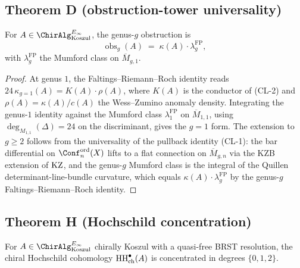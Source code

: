 \subsection{Theorem D (obstruction-tower universality)}
\label{subsec:climax-thmD}

\begin{corollary}
\label{cor:thmD-from-climax}
\ClaimStatusProvedHere
For \(A \in \ChirAlgInf_{\mathrm{Koszul}}\), the genus-\(g\)
obstruction is
\[
  \operatorname{obs}_{g}(A) \;=\; \kappa(A) \cdot \lambda_{g}^{\mathrm{FP}},
\]
with \(\lambda_{g}^{\mathrm{FP}}\) the Mumford class on
\(\overline{M}_{g,1}\).
\end{corollary}

\begin{proof}
At genus \(1\), the Faltings--Riemann--Roch identity reads
\(24\,\kappa_{g=1}(A) = K(A) \cdot \rho(A)\), where \(K(A)\) is the
conductor of \textup{(CL-2)} and \(\rho(A) = \kappa(A)/c(A)\) the
Wess--Zumino anomaly density. Integrating the genus-\(1\) identity
against the Mumford class \(\lambda_{1}^{\mathrm{FP}}\) on
\(\overline{M}_{1,1}\), using \(\deg_{M_{1,1}}(\Delta) = 24\) on the
discriminant, gives the \(g=1\) form. The extension to \(g \geq 2\)
follows from the universality of the pullback identity \textup{(CL-1)}:
the bar differential on \(\Conf_{n}^{\mathrm{ord}}(X)\) lifts to a flat
connection on \(\overline{M}_{g,n}\) via the KZB extension of \(\mathrm{KZ}\),
and the genus-\(g\) Mumford class is the integral of the Quillen
determinant-line-bundle curvature, which equals
\(\kappa(A) \cdot \lambda_{g}^{\mathrm{FP}}\) by the genus-\(g\)
Faltings--Riemann--Roch identity.
\end{proof}

\subsection{Theorem H (Hochschild concentration)}
\label{subsec:climax-thmH}

\begin{corollary}
\label{cor:thmH-from-climax}
\ClaimStatusProvedHere
For \(A \in \ChirAlgInf_{\mathrm{Koszul}}\) chirally Koszul with a
quasi-free BRST resolution, the chiral Hochschild cohomology
\(\mathrm{HH}_{\mathrm{ch}}^{\bullet}(A)\) is concentrated in degrees
\(\{0, 1, 2\}\).
\end{corollary}

